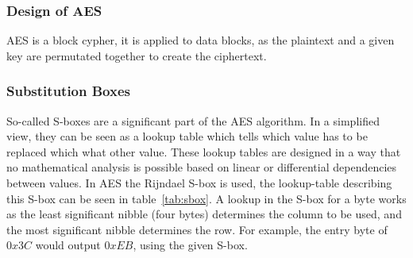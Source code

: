 \subsubsection{Design of AES}

AES is a block cypher, it is applied to data blocks, as the plaintext and a
given key are permutated together to create the ciphertext.

\subsubsection{Substitution Boxes}

So-called S-boxes are a significant part of the AES algorithm. In a simplified
view, they can be seen as a lookup table which tells which value has to be
replaced which what other value. These lookup tables are designed in a way that
no mathematical analysis is possible based on linear or differential
dependencies between values. In AES the Rijndael S-box is used, the
lookup-table describing this S-box can be seen in table~\ref{tab:sbox}. A
lookup in the S-box for a byte works as the least significant nibble (four
bytes) determines the column to be used, and the most significant nibble
determines the row. For example, the entry byte of $0x3C$ would output $0xEB$,
using the given S-box.

